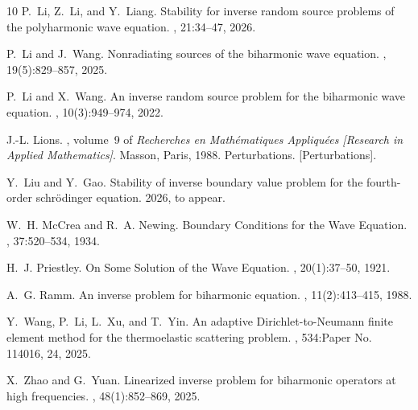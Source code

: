 \documentclass[12pt,reqno]{amsart}
\numberwithin{equation}{section}
\begin{document}
\begin{thebibliography}{10}
P.~Li, Z.~Li, and Y.~Liang.
\newblock Stability for inverse random source problems of the polyharmonic wave
  equation.
, 21:34--47, 2026.

P.~Li and J.~Wang.
\newblock Nonradiating sources of the biharmonic wave equation.
, 19(5):829--857, 2025.

P.~Li and X.~Wang.
\newblock An inverse random source problem for the biharmonic wave equation.
, 10(3):949--974, 2022.

J.-L. Lions.
, volume~9 of {\em Recherches en
  Math\'{e}matiques Appliqu\'{e}es [Research in Applied Mathematics]}.
\newblock Masson, Paris, 1988.
\newblock Perturbations. [Perturbations].

Y.~Liu and Y.~Gao.
\newblock Stability of inverse boundary value problem for the fourth-order
  schr{\"o}dinger equation.
 2026, to appear.

W.~H. McCrea and R.~A. Newing.
\newblock Boundary {C}onditions for the {W}ave {E}quation.
, 37:520--534, 1934.

H.~J. Priestley.
\newblock On {S}ome {S}olution of the {W}ave {E}quation.
, 20(1):37--50, 1921.

A.~G. Ramm.
\newblock An inverse problem for biharmonic equation.
, 11(2):413--415, 1988.

Y.~Wang, P.~Li, L.~Xu, and T.~Yin.
\newblock An adaptive {D}irichlet-to-{N}eumann finite element method for the
  thermoelastic scattering problem.
, 534:Paper No. 114016, 24, 2025.

X.~Zhao and G.~Yuan.
\newblock Linearized inverse problem for biharmonic operators at high
  frequencies.
, 48(1):852--869, 2025.

\end{thebibliography}

	
	
	
	
	
	
%	
\end{document}
